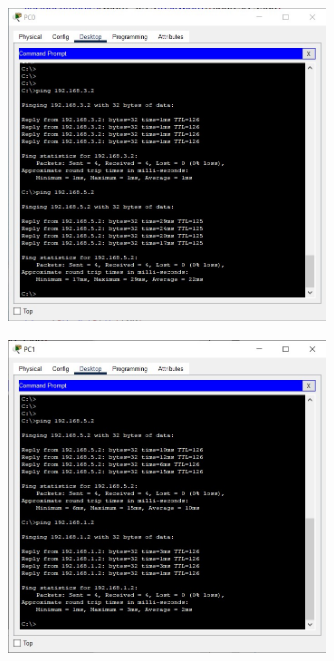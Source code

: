 \documentclass{article}
\begin{document}
\section{}%
\begin{figure}[H]
    \centering
    \includegraphics[width=0.75\textwidth]{figures/25.jpg}
    \caption{}
    \label{fig:fig1}
\end{figure}
\begin{figure}[H]
    \centering
    \includegraphics[width=0.75\textwidth]{figures/26.jpg}
    \caption{}
    \label{fig:fig1}
\end{figure}
\end{document}
